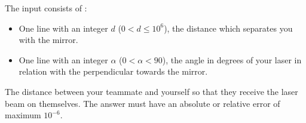 \begin{figure}[h]
\end{figure}



\begin{Input}
	The input consists of :
	\begin{itemize}
		\item One line with an integer $d$ ($0 < d \le 10^6$), the distance which separates you with the mirror.
		\item One line with an integer $\alpha$ ($0 < \alpha < 90$), the angle in degrees of your laser in relation with the perpendicular towards the mirror.
	\end{itemize}
\end{Input}

\begin{Output}
	The distance between your teammate and yourself so that they receive the laser beam on themselves.
	The answer must have an absolute or relative error of maximum $10^{-6}$.
\end{Output}

